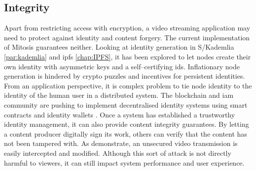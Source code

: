 \subsection{Integrity}
Apart from restricting access with encryption, a video streaming application may need to protect against identity and content forgery. The current implementation of Mitosis guarantees neither. Looking at identity generation in S/Kademlia \vref{par:kademlia} and \gls{ipfs} \vref{chap:IPFS}, it has been explored to let nodes create their own identity with asymmetric keys and a self–certifying ids. Inflationary node generation is hindered by crypto puzzles and incentives for persistent identities. From an application perspective, it is complex problem to tie node identity to the identity of the human user in a distributed system. The blockchain and \gls{iam} community are pushing to implement decentralised identity systems using smart contracts \cite{eth-identity} and identity wallets \cite{gartner-iam}.
Once a system has established a trustworthy identity management, it can also provide content integrity guarantees. By letting a content producer digitally sign its work, others can verify that the content has not been tampered with. As \citet[\S7]{anatomy-personalized-livestreaming} demonstrate, an unsecured video transmission is easily intercepted and modified. Although this sort of attack is not directly harmful to viewers, it can still impact system performance and user experience.

